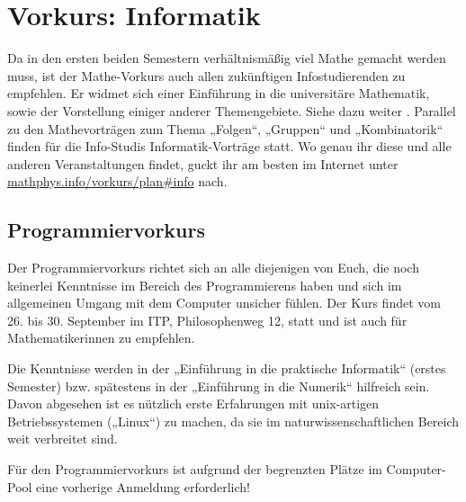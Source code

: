 \section{Vorkurs: Informatik}
\label{vkinfo}
Da in den ersten beiden Semestern verhältnismäßig viel Mathe gemacht werden muss, ist der Mathe-Vorkurs auch allen zukünftigen Infostudierenden zu empfehlen. Er widmet sich einer Einführung in die universitäre Mathematik, sowie der Vorstellung einiger anderer Themengebiete. Siehe dazu weiter
.
Parallel zu den Mathevorträgen zum Thema „Folgen“, „Gruppen“ und „Kombinatorik“ finden für die Info-Studis Informatik-Vorträge statt.
Wo genau ihr diese und alle anderen Veranstaltungen findet, guckt ihr am besten im Internet unter \url{mathphys.info/vorkurs/plan\#info}  nach.


\parskip

\subsection{Programmiervorkurs}
Der Programmiervorkurs richtet sich an alle diejenigen von Euch, die noch keinerlei Kenntnisse im Bereich des Programmierens haben und sich im allgemeinen Umgang mit dem Computer unsicher fühlen. Der Kurs findet vom 26. bis 30. September im \gls{ITP}, Philosophenweg 12, statt und ist auch für Mathematikerinnen zu empfehlen.

Die Kenntnisse werden in der „Einführung in die praktische Informatik“ (erstes Semester) bzw. spätestens in der „Einführung in die Numerik“ hilfreich sein. Davon abgesehen ist es nützlich erste Erfahrungen mit unix-artigen Betriebssystemen („Linux“) zu machen, da sie im naturwissenschaftlichen Bereich weit verbreitet sind.

Für den Programmiervorkurs ist aufgrund der begrenzten Plätze im Computer-Pool eine vorherige Anmeldung erforderlich!
